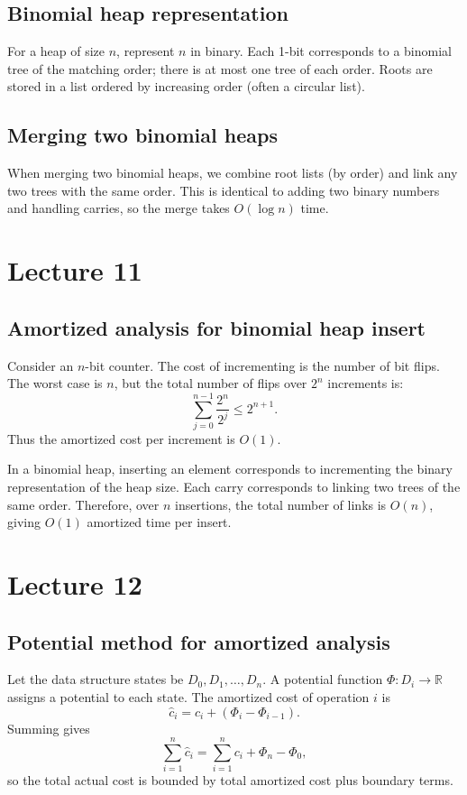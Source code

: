 \documentclass[11pt]{article}
\begin{document}
{{{{\subsection*{Binomial heap representation}
For a heap of size $n$, represent $n$ in binary. Each 1-bit corresponds to a binomial tree of the
matching order; there is at most one tree of each order. Roots are stored in a list ordered by
increasing order (often a circular list).

\subsection*{Merging two binomial heaps}
When merging two binomial heaps, we combine root lists (by order) and link any two trees with the
same order. This is identical to adding two binary numbers and handling carries, so the merge takes
$O(\log n)$ time.

\section{Lecture 11}

\subsection*{Amortized analysis for binomial heap insert}
Consider an $n$-bit counter. The cost of incrementing is the number of bit flips. The worst case
is $n$, but the total number of flips over $2^n$ increments is:
\[
\sum_{j=0}^{n-1} \frac{2^n}{2^j} \le 2^{n+1}.
\]
Thus the amortized cost per increment is $O(1)$.

In a binomial heap, inserting an element corresponds to incrementing the binary representation of
the heap size. Each carry corresponds to linking two trees of the same order. Therefore, over $n$
insertions, the total number of links is $O(n)$, giving $O(1)$ amortized time per insert.

\section{Lecture 12}

\subsection*{Potential method for amortized analysis}
Let the data structure states be $D_0, D_1, \ldots, D_n$. A potential function
$\Phi: D_i \to \mathbb{R}$ assigns a potential to each state. The amortized cost of operation $i$ is
\[
\hat{c}_i = c_i + (\Phi_i - \Phi_{i-1}).
\]
Summing gives
\[
\sum_{i=1}^n \hat{c}_i = \sum_{i=1}^n c_i + \Phi_n - \Phi_0,
\]
so the total actual cost is bounded by total amortized cost plus boundary terms.

}}}}
\end{document}
